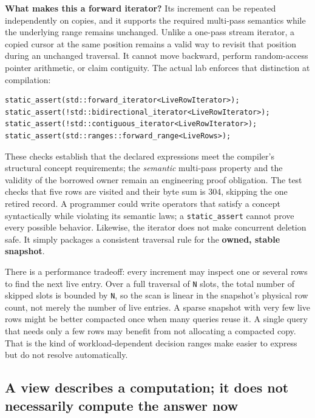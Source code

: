 \textbf{What makes this a forward iterator?} Its increment can be repeated independently on copies, and it supports the required multi-pass semantics while the underlying range remains unchanged. Unlike a one-pass stream iterator, a copied cursor at the same position remains a valid way to revisit that position during an unchanged traversal. It cannot move backward, perform random-access pointer arithmetic, or claim contiguity. The actual lab enforces that distinction at compilation:

\begin{verbatim}
static_assert(std::forward_iterator<LiveRowIterator>);
static_assert(!std::bidirectional_iterator<LiveRowIterator>);
static_assert(!std::contiguous_iterator<LiveRowIterator>);
static_assert(std::ranges::forward_range<LiveRows>);
\end{verbatim}

These checks establish that the declared expressions meet the compiler's structural concept requirements; the \emph{semantic} multi-pass property and the validity of the borrowed owner remain an engineering proof obligation. The test checks that five rows are visited and their byte sum is 304, skipping the one retired record. A programmer could write operators that satisfy a concept syntactically while violating its semantic laws; a \texttt{static\_assert} cannot prove every possible behavior. Likewise, the iterator does not make concurrent deletion safe. It simply packages a consistent traversal rule for the \textbf{owned, stable snapshot}.

There is a performance tradeoff: every increment may inspect one or several rows to find the next live entry. Over a full traversal of \texttt{N} slots, the total number of skipped slots is bounded by \texttt{N}, so the scan is linear in the snapshot's physical row count, not merely the number of live entries. A sparse snapshot with very few live rows might be better compacted once when many queries reuse it. A single query that needs only a few rows may benefit from not allocating a compacted copy. That is the kind of workload-dependent decision ranges make easier to express but do not resolve automatically.

\subsection{A view describes a computation; it does not necessarily compute the answer now}\label{05-engine-i-ch006-a-view-describes-a-computation-it-does-not-necessarily-compute-the-answer-now}

